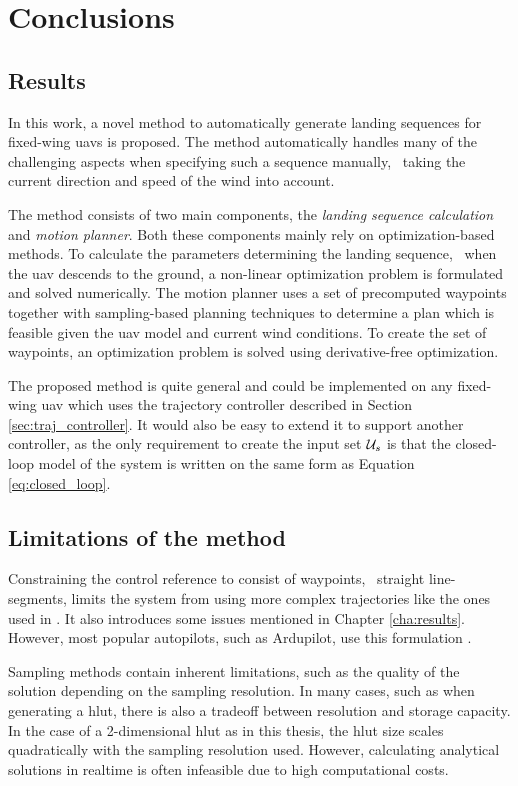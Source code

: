 \chapter{Conclusions}\label{cha:discussion}
\section{Results}
In this work, a novel method to automatically generate landing sequences for fixed-wing \acp{uav} is proposed. 
The method automatically handles many of the challenging aspects when specifying such a sequence manually, \eg\ taking the current 
direction and speed of the wind into account.

The method consists of two main components, the \textit{landing sequence calculation} and \textit{motion planner}. Both these components mainly rely on optimization-based methods. 
To calculate the parameters determining the landing sequence, \ie\ when the \ac{uav} descends to the ground, a non-linear optimization problem is 
formulated and solved numerically. The motion planner uses a set of precomputed waypoints together with sampling-based planning techniques to determine a plan which is feasible given the 
\ac{uav} model and current wind conditions. To create the set of waypoints, an optimization problem is solved using derivative-free optimization.

The proposed method is quite general and could be implemented on any fixed-wing \ac{uav} which uses the trajectory controller described in Section \ref{sec:traj_controller}. 
It would also be easy to extend it to support another controller, as the only requirement to create the input set $\mathcal{U}_s$ is that the closed-loop model of the system is written on the same form as 
Equation \eqref{eq:closed_loop}.

\section{Limitations of the method}
Constraining the control reference to consist of waypoints, \ie\ straight line-seg\-ments, limits the system from using more complex trajectories like the ones used in \cite{emergency_landing}. It also introduces some issues mentioned in Chapter \ref{cha:results}. 
However, most popular autopilots, such as Ardupilot, use this formulation \cite{arduplane}. 

Sampling methods contain inherent limitations, such as the 
quality of the solution depending on the sampling resolution. In many cases, such as when generating a \ac{hlut}, there is also a tradeoff between resolution and storage capacity. In the case of a 2-dimensional \ac{hlut} as in this thesis, the \ac{hlut} size scales quadratically with the sampling resolution used. 
However, calculating analytical solutions in realtime is often infeasible due to high computational costs.

